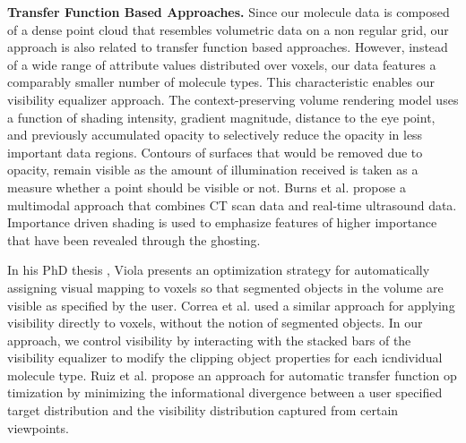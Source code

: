 \noindent
\textbf{Transfer Function Based Approaches.}
Since our molecule data is composed of a dense point cloud that resembles volumetric data on a non regular grid, our approach is also related to transfer function based approaches.
However, instead of a wide range of attribute values distributed over voxels, our data features a comparably smaller number of molecule types. This characteristic enables our visibility equalizer approach. %
The context-preserving volume rendering model \cite{Bruckner05} uses a function of shading intensity, gradient magnitude, distance to the eye point, and previously accumulated opacity to selectively reduce the opacity in less important data regions. Contours of surfaces that would be removed due to opacity, remain visible as the amount of illumination received is taken as a measure whether a point should be visible or not.
Burns et al. \cite{Burns07} propose a multimodal approach that combines CT scan data and real-time ultrasound data. Importance driven shading is used to emphasize features of higher importance that have been revealed through the ghosting.

In his PhD thesis \cite{phd-viola}, Viola presents an optimization strategy for automatically assigning visual mapping to voxels so that segmented objects in the volume are visible as specified by the user. Correa et al. \cite{correa11} used a similar approach for applying visibility directly to voxels, without the notion of segmented objects.
In our approach, we control visibility by interacting with the stacked bars of the visibility equalizer to modify the clipping object properties for each icndividual molecule type.
Ruiz et al. \cite{ruiz11} propose an approach for automatic transfer function op
timization by minimizing the informational divergence between a user specified target distribution and the visibility distribution captured from certain viewpoints. 

